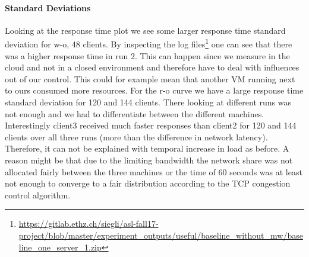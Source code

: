 \documentclass[11pt,a4paper]{article}
\begin{document}
\paragraph{Standard Deviations}
Looking at the response time plot we see some larger response time standard deviation for w-o, 48 clients. By inspecting the log files\footnote{\url{https://gitlab.ethz.ch/siegli/asl-fall17-project/blob/master/experiment_outputs/useful/baseline_without_mw/baseline_one_server_1.zip}} one can see that there was a higher response time in run 2. This can happen since we measure in the cloud and not in a closed environment and therefore have to deal with influences out of our control. This could for example mean that another VM running next to ours consumed more resources. For the r-o curve we have a large response time standard deviation for 120 and 144 clients. There looking at different runs was not enough and we had to differentiate between the different machines. Interestingly client3 received much faster responses than client2 for 120 and 144 clients over all three runs (more than the difference in network latency). Therefore, it can not be explained with temporal increase in load as before. A reason might be that due to the limiting bandwidth the network share was not allocated fairly between the three machines or the time of 60 seconds was at least not enough to converge to a fair distribution according to the TCP congestion control algorithm. 
\end{document}
